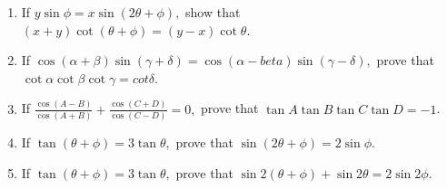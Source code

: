 \begin{enumerate}[resume]
\item If $y\sin\phi = x\sin(2\theta + \phi),$ show that $(x + y)\cot(\theta + \phi) = (y - x)\cot\theta$.

\item If $\cos(\alpha + \beta)\sin(\gamma + \delta) = \cos(\alpha - beta)\sin(\gamma - \delta),$ prove that
    $\cot\alpha\cot\beta\cot\gamma = cot\delta$.

\item If $\frac{\cos(A - B)}{\cos(A + B)} + \frac{\cos(C + D)}{\cos(C - D)} = 0,$ prove that $\tan A\tan B\tan C\tan D =
    -1$.

\item If $\tan(\theta + \phi) = 3\tan\theta,$ prove that $\sin(2\theta + \phi) = 2\sin\phi$.

\item If $\tan(\theta + \phi) = 3\tan\theta,$ prove that $\sin2(\theta + \phi) + \sin2\theta = 2\sin2\phi$.
\end{enumerate}
